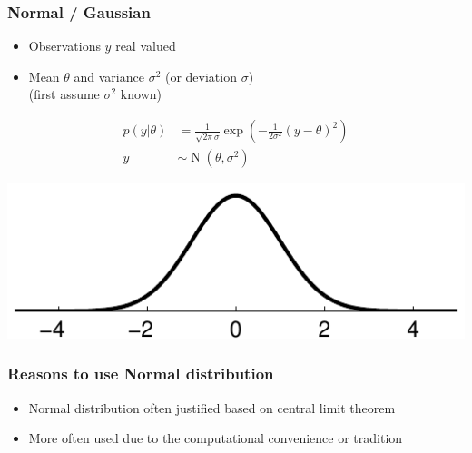 \documentclass[english,t]{beamer}
\DeclareMathOperator{\N}{N}
\begin{document}
\begin{frame}
  \frametitle{Normal / Gaussian}

  \begin{itemize}
  \item Observations $y$ real valued
  \item Mean $\theta$ and variance $\sigma^2$ (or deviation $\sigma$)\\
    (first assume $\sigma^2$ known)
  \end{itemize}
  \vskip -2mm
  \begin{align*}
    p(y|\theta)&=\frac{1}{\sqrt{2\pi}\sigma}\exp\left(-\frac{1}{2\sigma^2}(y-\theta)^2\right)\\
    y & \sim \N(\theta,\sigma^2)
  \end{align*}

  \begin{center}
      \includegraphics[clip]{kuva2b_1}
  \end{center}
\end{frame}

\begin{frame}

  \frametitle{Reasons to use Normal distribution}

  \begin{itemize}
  \item Normal distribution often justified based on central limit theorem
  \item More often used due to the computational convenience or tradition
  \end{itemize}

\end{frame}

\end{document}
